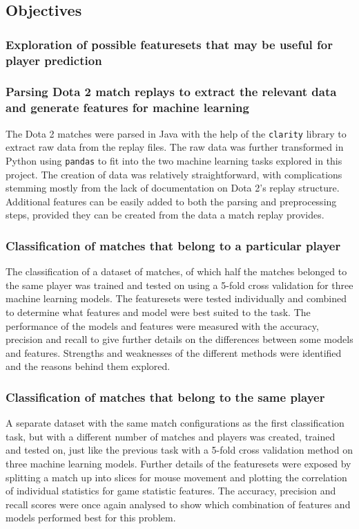 \documentclass[Report.tex]{subfiles}
\begin{document}
\subsection{Objectives}

\subsubsection{Exploration of possible featuresets that may be useful for player prediction}

\subsubsection{Parsing Dota 2 match replays to extract the relevant data and generate features for machine learning}
The Dota 2 matches were parsed in Java with the help of the \texttt{clarity} library to extract raw data from the replay files. The raw data was further transformed in Python using \texttt{pandas} to fit into the two machine learning tasks explored in this project. The creation of data was relatively straightforward, with complications stemming mostly from the lack of documentation on Dota 2's replay structure. Additional features can be easily added to both the parsing and preprocessing steps, provided they can be created from the data a match replay provides.

\subsubsection{Classification of matches that belong to a particular player}
The classification of a dataset of matches, of which half the matches belonged to the same player was trained and tested on using a 5-fold cross validation for three machine learning models. The featuresets were tested individually and combined to determine what features and model were best suited to the task. The performance of the models and features were measured with the accuracy, precision and recall to give further details on the differences between some models and features. Strengths and weaknesses of the different methods were identified and the reasons behind them explored. 

\subsubsection{Classification of matches that belong to the same player}
A separate dataset with the same match configurations as the first classification task, but with a different number of matches and players was created, trained and tested on, just like the previous task with a 5-fold cross validation method on three machine learning models. Further details of the featuresets were exposed by splitting a match up into slices for mouse movement and plotting the correlation of individual statistics for game statistic features. The accuracy, precision and recall scores were once again analysed to show which combination of features and models performed best for this problem. 
\end{document}
